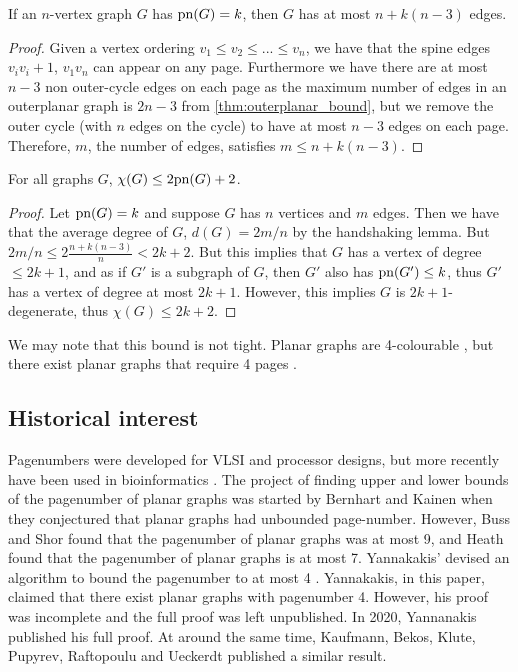 \begin{lemma}\label{lem:Edge_Bound}
	If an $n$-vertex graph $G$ has $\text{pn}(G) = k$, then $G$ has at most $n + k(n-3)$ edges.
\end{lemma}
\begin{proof}
	Given a vertex ordering $v_1 \leq v_2 \leq ... \leq v_n$, we have that the spine edges $v_i v_i+1$, $v_1 v_n$  can appear on any page. Furthermore we have there are at most $n-3$ non outer-cycle edges on each page as the maximum number of edges in an outerplanar graph is $2n - 3$ from \cref{thm:outerplanar_bound}, but we remove the outer cycle (with $n$ edges on the cycle) to have at most $n-3$ edges on each page. Therefore, $m$, the number of edges, satisfies $m \leq n + k (n - 3)$. 
\end{proof}
\begin{theorem}\label{thm:Colouring_Bound}
	For all graphs $G$, $\chi(G) \leq 2 \text{pn}(G) + 2$.
\end{theorem}
\begin{proof}
	Let $\text{pn}(G) = k$ and suppose $G$ has $n$ vertices and $m$ edges. Then we have that the average degree of $G$, $d(G) = 2m/n$ by the handshaking lemma. But $2m/n \leq 2 \frac{n + k(n-3)}{n} < 2k + 2$. But this implies that $G$ has a vertex of degree $\leq 2k + 1$, and as if $G'$ is a subgraph of $G$, then $G'$ also has $\text{pn}(G') \leq k$, thus $G'$ has a vertex of degree at most $2k + 1$. However, this implies $G$ is $2k + 1$-degenerate, thus $\chi(G) \leq 2k + 2$. 
\end{proof}
We may note that this bound is not tight. Planar graphs are 4-colourable \cite{appelEveryPlanarMap1989}, but there exist planar graphs that require 4 pages \cite{yannakakisPlanarGraphsThat2020, kaufmannFourPagesAre2020}. 

\subsection{Historical interest}\label{ssec:Pagenumber_History}
Pagenumbers were developed for VLSI and processor designs, but more recently have been used in bioinformatics \cite{haslingerRNAStructuresPseudoknots1999}. 
The project of finding upper and lower bounds of the pagenumber of planar graphs was started by Bernhart and Kainen when they conjectured that planar graphs had unbounded page-number. However, Buss and Shor\cite{bussPagenumberPlanarGraphs1984} found that the pagenumber of planar graphs was at most 9, and Heath \cite{heathEmbeddingPlanarGraphs1984} found that the pagenumber of planar graphs is at most 7. Yannakakis' devised an algorithm to bound the pagenumber to at most 4 \cite{yannakakisEmbeddingPlanarGraphs1989}. Yannakakis, in this paper, claimed that there exist planar graphs with pagenumber 4. However, his proof was incomplete and the full proof was left unpublished. In 2020, Yannanakis published his full proof. \cite{yannakakisPlanarGraphsThat2020} At around the same time, Kaufmann, Bekos, Klute, Pupyrev, Raftopoulu and Ueckerdt published a similar result\cite{kaufmannFourPagesAre2020}. 

